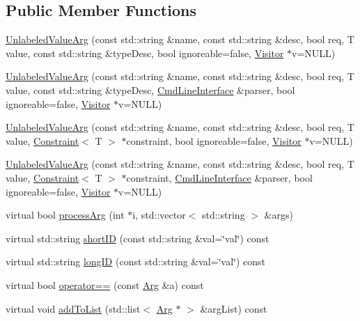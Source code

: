 \subsection*{Public Member Functions}
\begin{DoxyCompactItemize}
\item 
\hyperlink{class_t_c_l_a_p_1_1_unlabeled_value_arg_acba2fddd0719ccd90f48fcf06aaffbee}{Unlabeled\+Value\+Arg} (const std\+::string \&name, const std\+::string \&desc, bool req, T value, const std\+::string \&type\+Desc, bool ignoreable=false, \hyperlink{class_t_c_l_a_p_1_1_visitor}{Visitor} $\ast$v=N\+U\+L\+L)
\item 
\hyperlink{class_t_c_l_a_p_1_1_unlabeled_value_arg_a9eafea8158d27a5af48e92f62debcf65}{Unlabeled\+Value\+Arg} (const std\+::string \&name, const std\+::string \&desc, bool req, T value, const std\+::string \&type\+Desc, \hyperlink{class_t_c_l_a_p_1_1_cmd_line_interface}{Cmd\+Line\+Interface} \&parser, bool ignoreable=false, \hyperlink{class_t_c_l_a_p_1_1_visitor}{Visitor} $\ast$v=N\+U\+L\+L)
\item 
\hyperlink{class_t_c_l_a_p_1_1_unlabeled_value_arg_a2aa148ef6a2016bb3f32a33a7c644404}{Unlabeled\+Value\+Arg} (const std\+::string \&name, const std\+::string \&desc, bool req, T value, \hyperlink{class_t_c_l_a_p_1_1_constraint}{Constraint}$<$ T $>$ $\ast$constraint, bool ignoreable=false, \hyperlink{class_t_c_l_a_p_1_1_visitor}{Visitor} $\ast$v=N\+U\+L\+L)
\item 
\hyperlink{class_t_c_l_a_p_1_1_unlabeled_value_arg_afd3af78fccd14f2654e9b2f981ead12f}{Unlabeled\+Value\+Arg} (const std\+::string \&name, const std\+::string \&desc, bool req, T value, \hyperlink{class_t_c_l_a_p_1_1_constraint}{Constraint}$<$ T $>$ $\ast$constraint, \hyperlink{class_t_c_l_a_p_1_1_cmd_line_interface}{Cmd\+Line\+Interface} \&parser, bool ignoreable=false, \hyperlink{class_t_c_l_a_p_1_1_visitor}{Visitor} $\ast$v=N\+U\+L\+L)
\item 
virtual bool \hyperlink{class_t_c_l_a_p_1_1_unlabeled_value_arg_ad853d7950a659b0d4ee2cda3f61261fd}{process\+Arg} (int $\ast$i, std\+::vector$<$ std\+::string $>$ \&args)
\item 
virtual std\+::string \hyperlink{class_t_c_l_a_p_1_1_unlabeled_value_arg_abda4d1d695003ba165b6797e03007a99}{short\+I\+D} (const std\+::string \&val=\char`\"{}val\char`\"{}) const 
\item 
virtual std\+::string \hyperlink{class_t_c_l_a_p_1_1_unlabeled_value_arg_ade738f42a7867324ce780b0c240b0460}{long\+I\+D} (const std\+::string \&val=\char`\"{}val\char`\"{}) const 
\item 
virtual bool \hyperlink{class_t_c_l_a_p_1_1_unlabeled_value_arg_a74632cd4d169481518cb1a871f97b412}{operator==} (const \hyperlink{class_t_c_l_a_p_1_1_arg}{Arg} \&a) const 
\item 
virtual void \hyperlink{class_t_c_l_a_p_1_1_unlabeled_value_arg_a8670fc7797254e602d302318063f3515}{add\+To\+List} (std\+::list$<$ \hyperlink{class_t_c_l_a_p_1_1_arg}{Arg} $\ast$ $>$ \&arg\+List) const 
\end{DoxyCompactItemize}
